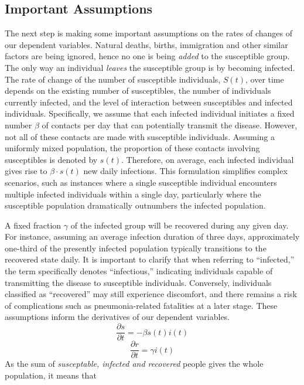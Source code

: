 \subsection{Important Assumptions}
\indent The next step is making some important assumptions on the rates of changes of our dependent variables.
Natural deaths, births, immigration and other similar factors are being ignored, hence no one is being \textit{added} to the susceptible group.
The only way an individual \textit{leaves} the susceptible group is by becoming infected.
The rate of change of the number of susceptible individuals, $S(t)$, over time depends on the existing number of susceptibles, the number of individuals currently infected, and the level of interaction between susceptibles and infected individuals.
Specifically, we assume that each infected individual initiates a fixed number $\beta$ of contacts per day that can potentially transmit the disease.
However, not all of these contacts are made with susceptible individuals.
Assuming a uniformly mixed population, the proportion of these contacts involving susceptibles is denoted by $s(t)$.
Therefore, on average, each infected individual gives rise to $\beta \cdot s(t)$ new daily infections.
This formulation simplifies complex scenarios, such as instances where a single susceptible individual encounters multiple infected individuals within a single day, particularly where the susceptible population dramatically outnumbers the infected population.
\par \bigskip
A fixed fraction $\gamma$ of the infected group will be recovered during any given day.
For instance, assuming an average infection duration of three days, approximately one-third of the presently infected population typically transitions to the recovered state daily.
It is important to clarify that when referring to ``infected,'' the term specifically denotes ``infectious,'' indicating individuals capable of transmitting the disease to susceptible individuals.
Conversely, individuals classified as ``recovered'' may still experience discomfort, and there remains a risk of complications such as pneumonia-related fatalities at a later stage.
These assumptions inform the derivatives of our dependent variables.
\begin{equation}
	\frac{\partial s}{\partial t} = -\beta s(t)  i(t)
\end{equation}
\begin{equation}
	\frac{\partial r}{\partial t} = \gamma i(t)
\end{equation}
As the sum of \textit{susceptable, infected and recovered} people gives the whole population, it means that
